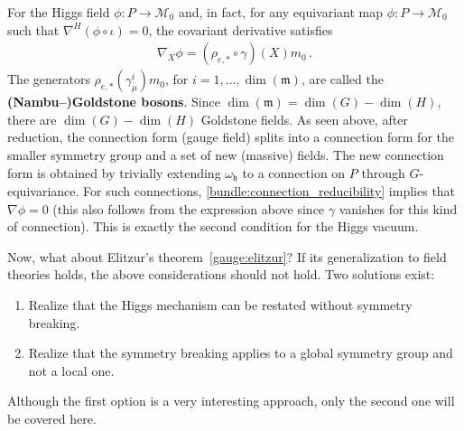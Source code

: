     For the Higgs field $\phi:P\rightarrow\mathcal{M}_0$ and, in fact, for any equivariant map $\phi:P\rightarrow\mathcal{M}_0$ such that $\nabla^H(\phi\circ\iota)=0$, the covariant derivative satisfies
    \begin{gather}
        \nabla_X\phi = (\rho_{e,\ast}\circ\gamma)(X)m_0\,.
    \end{gather}
    The generators $\rho_{e,\ast}(\gamma^i_\mu)m_0$, for $i=1,\ldots,\dim(\mathfrak{m})$, are called the \textbf{(Nambu--)Goldstone bosons}. Since $\dim(\mathfrak{m})=\dim(G)-\dim(H)$, there are $\dim(G)-\dim(H)$ Goldstone fields. As seen above, after reduction, the connection form (gauge field) splits into a connection form for the smaller symmetry group and a set of new (massive) fields. The new connection form is obtained by trivially extending $\omega_{\mathfrak{h}}$ to a connection on $P$ through $G$-equivariance. For such connections, \cref{bundle:connection_reducibility} implies that $\nabla\phi=0$ (this also follows from the expression above since $\gamma$ vanishes for this kind of connection). This is exactly the second condition for the Higgs vacuum.

    Now, what about Elitzur's theorem~\ref{gauge:elitzur}? If its generalization to field theories holds, the above considerations should not hold. Two solutions exist:
    \begin{enumerate}
        \item Realize that the Higgs mechanism can be restated without symmetry breaking.
        \item Realize that the symmetry breaking applies to a global symmetry group and not a local one.
    \end{enumerate}
    Although the first option is a very interesting approach, only the second one will be covered here. 

